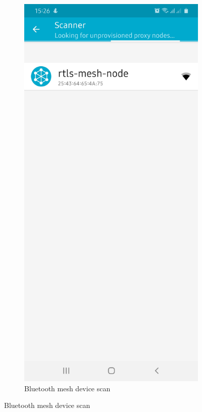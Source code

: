 \documentclass[\main/main.tex]{subfiles}
\begin{document}
\begin{figure}[H]
    \centering
    \begin{subfigure}[b]{0.4\linewidth}
        \centering
        \includegraphics[width=0.9\linewidth]{nRF_Mesh_00.jpg}
        \caption{Bluetooth mesh device scan}
    \end{subfigure}

\end{figure}
\end{document}
